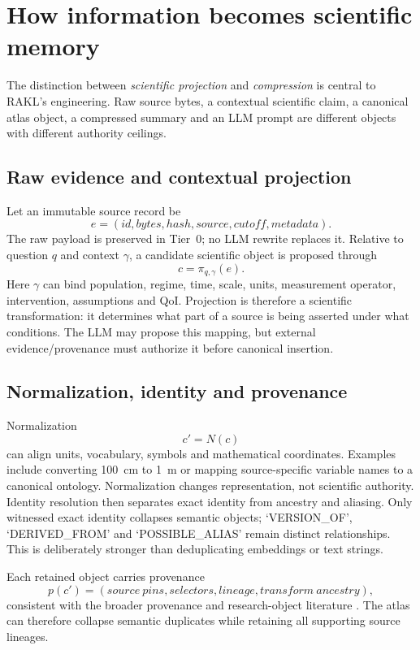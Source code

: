\section{How information becomes scientific memory}
The distinction between \emph{scientific projection} and \emph{compression} is central to RAKL's engineering. Raw source bytes, a contextual scientific claim, a canonical atlas object, a compressed summary and an LLM prompt are different objects with different authority ceilings.

\subsection{Raw evidence and contextual projection}
Let an immutable source record be
\begin{equation}
e=(id,bytes,hash,source,cutoff,metadata).
\end{equation}
The raw payload is preserved in Tier~0; no LLM rewrite replaces it. Relative to question $q$ and context $\gamma$, a candidate scientific object is proposed through
\begin{equation}c=\pi_{q,\gamma}(e).
\end{equation}
Here $\gamma$ can bind population, regime, time, scale, units, measurement operator, intervention, assumptions and QoI. Projection is therefore a scientific transformation: it determines what part of a source is being asserted under what conditions. The LLM may propose this mapping, but external evidence/provenance must authorize it before canonical insertion.

\subsection{Normalization, identity and provenance}
Normalization
\begin{equation}c'=N(c)
\end{equation}
can align units, vocabulary, symbols and mathematical coordinates. Examples include converting 100~cm to 1~m or mapping source-specific variable names to a canonical ontology. Normalization changes representation, not scientific authority. Identity resolution then separates exact identity from ancestry and aliasing. Only witnessed exact identity collapses semantic objects; `VERSION\_OF', `DERIVED\_FROM' and `POSSIBLE\_ALIAS' remain distinct relationships. This is deliberately stronger than deduplicating embeddings or text strings.

Each retained object carries provenance
\begin{equation}p(c')=(source\ pins,selectors,lineage,transform\ ancestry),
\end{equation}
consistent with the broader provenance and research-object literature \cite{moreau2013,wilkinson2016,soilandreyes2022,kuhn2018}. The atlas can therefore collapse semantic duplicates while retaining all supporting source lineages.

